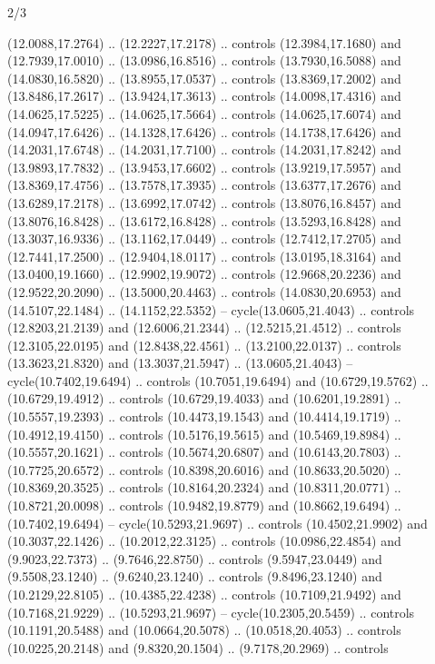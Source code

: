\begin{flagdescription}{2/3}
\begin{scope}[yshift=\flagwidth,scale=\flagwidth/1241.93737]
\begin{scope}[y=-1mm, x=1mm,draw=gold,fill=blue,line join=miter,miter limit=4,line width=1.8\lw]
{  (12.0088,17.2764) .. (12.2227,17.2178) .. controls (12.3984,17.1680) and
  (12.7939,17.0010) .. (13.0986,16.8516) .. controls (13.7930,16.5088) and
  (14.0830,16.5820) .. (13.8955,17.0537) .. controls (13.8369,17.2002) and
  (13.8486,17.2617) .. (13.9424,17.3613) .. controls (14.0098,17.4316) and
  (14.0625,17.5225) .. (14.0625,17.5664) .. controls (14.0625,17.6074) and
  (14.0947,17.6426) .. (14.1328,17.6426) .. controls (14.1738,17.6426) and
  (14.2031,17.6748) .. (14.2031,17.7100) .. controls (14.2031,17.8242) and
  (13.9893,17.7832) .. (13.9453,17.6602) .. controls (13.9219,17.5957) and
  (13.8369,17.4756) .. (13.7578,17.3935) .. controls (13.6377,17.2676) and
  (13.6289,17.2178) .. (13.6992,17.0742) .. controls (13.8076,16.8457) and
  (13.8076,16.8428) .. (13.6172,16.8428) .. controls (13.5293,16.8428) and
  (13.3037,16.9336) .. (13.1162,17.0449) .. controls (12.7412,17.2705) and
  (12.7441,17.2500) .. (12.9404,18.0117) .. controls (13.0195,18.3164) and
  (13.0400,19.1660) .. (12.9902,19.9072) .. controls (12.9668,20.2236) and
  (12.9522,20.2090) .. (13.5000,20.4463) .. controls (14.0830,20.6953) and
  (14.5107,22.1484) .. (14.1152,22.5352) -- cycle(13.0605,21.4043) .. controls
  (12.8203,21.2139) and (12.6006,21.2344) .. (12.5215,21.4512) .. controls
  (12.3105,22.0195) and (12.8438,22.4561) .. (13.2100,22.0137) .. controls
  (13.3623,21.8320) and (13.3037,21.5947) .. (13.0605,21.4043) --
  cycle(10.7402,19.6494) .. controls (10.7051,19.6494) and (10.6729,19.5762) ..
  (10.6729,19.4912) .. controls (10.6729,19.4033) and (10.6201,19.2891) ..
  (10.5557,19.2393) .. controls (10.4473,19.1543) and (10.4414,19.1719) ..
  (10.4912,19.4150) .. controls (10.5176,19.5615) and (10.5469,19.8984) ..
  (10.5557,20.1621) .. controls (10.5674,20.6807) and (10.6143,20.7803) ..
  (10.7725,20.6572) .. controls (10.8398,20.6016) and (10.8633,20.5020) ..
  (10.8369,20.3525) .. controls (10.8164,20.2324) and (10.8311,20.0771) ..
  (10.8721,20.0098) .. controls (10.9482,19.8779) and (10.8662,19.6494) ..
  (10.7402,19.6494) -- cycle(10.5293,21.9697) .. controls (10.4502,21.9902) and
  (10.3037,22.1426) .. (10.2012,22.3125) .. controls (10.0986,22.4854) and
  (9.9023,22.7373) .. (9.7646,22.8750) .. controls (9.5947,23.0449) and
  (9.5508,23.1240) .. (9.6240,23.1240) .. controls (9.8496,23.1240) and
  (10.2129,22.8105) .. (10.4385,22.4238) .. controls (10.7109,21.9492) and
  (10.7168,21.9229) .. (10.5293,21.9697) -- cycle(10.2305,20.5459) .. controls
  (10.1191,20.5488) and (10.0664,20.5078) .. (10.0518,20.4053) .. controls
  (10.0225,20.2148) and (9.8320,20.1504) .. (9.7178,20.2969) .. controls
}
\end{scope}
\end{scope}
\end{flagdescription}
